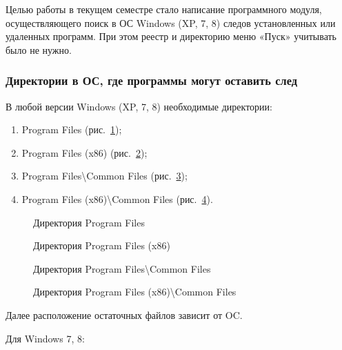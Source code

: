 Целью работы в текущем семестре стало написание программного модуля, осуществляющего поиск в ОС Windows (XP, 7, 8) следов установленных или удаленных программ. При этом реестр и директорию меню «Пуск» учитывать было не нужно.

\subsubsection{Директории в ОС, где программы могут оставить след}

В любой версии Windows (XP, 7, 8) необходимые директории:

\begin{enumerate}
  \item Program Files (рис.~\ref{kucher_1:kucher_1});
  \item Program Files (x86) (рис.~\ref{kucher_2:kucher_2});
  \item Program Files\textbackslash Common Files (рис.~\ref{kucher_3:kucher_3});
  \item Program Files (x86)\textbackslash Common Files (рис.~\ref{kucher_4:kucher_4}).
\end{enumerate}

\begin{figure}[h!]
\caption{Директория Program Files}
\label{kucher_1:kucher_1}
\end{figure} 

\begin{figure}[h!]
\caption{Директория Program Files (x86)}
\label{kucher_2:kucher_2}
\end{figure} 

\begin{figure}[h!]
\caption{Директория Program Files\textbackslash Common Files}
\label{kucher_3:kucher_3}
\end{figure} 

\begin{figure}[h!]
\caption{Директория Program Files (x86)\textbackslash Common Files}
\label{kucher_4:kucher_4}
\end{figure} 


Далее расположение остаточных файлов зависит от OC.

Для Windows 7, 8:

